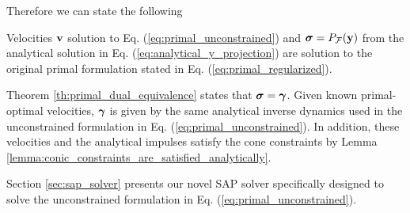 Therefore we can state the following
\begin{theorem}
    Velocities ${\mathbf{v}}$ solution to Eq. (\ref{eq:primal_unconstrained}) and
    ${\bm\sigma}=P_\mathcal{F}({\mathbf{y}})$ from the analytical solution in Eq.
    (\ref{eq:analytical_y_projection}) are solution to the original primal
    formulation stated in Eq. (\ref{eq:primal_regularized}).
\end{theorem}
\begin{IEEEproof}
    Theorem \ref{th:primal_dual_equivalence} states that ${\bm\sigma}={\bm\gamma}$.
    Given known primal-optimal velocities, ${\bm\gamma}$ is given by the same
    analytical inverse dynamics used in the unconstrained formulation in Eq.
    (\ref{eq:primal_unconstrained}).
    In addition, these velocities and the analytical impulses satisfy the cone
    constraints by Lemma \ref{lemma:conic_constraints_are_satisfied_analytically}.
\end{IEEEproof}

Section \ref{sec:sap_solver} presents our novel SAP solver specifically designed
to solve the unconstrained formulation in Eq. (\ref{eq:primal_unconstrained}).



